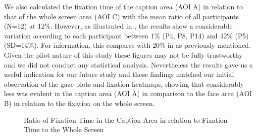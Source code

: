 \documentclass[output=paper]{langsci/langscibook}
\begin{document}
\largerpage[-1] 
We also calculated the fixation time of the caption area (AOI A) in relation to that of the whole screen area (AOI C) with the mean ratio of all participants (N=12) at 12\%.  However, as illustrated in , the results show a considerable variation according to each participant between 1\% (P4, P8, P14) and 42\% (P5) (SD=14\%).  For information, this compares with 20\% in \citet{dydewalle1991} as previously mentioned. Given the pilot nature of this study these figures may not be fully trustworthy and we did not conduct any statistical analysis. Nevertheless the results gave us a useful indication for our future study and these findings matched our initial observation of the gaze plots and fixation heatmaps, showing that considerably less  was evident in the caption area (AOI A) in comparison to the face area (AOI B) in relation to the fixation on the whole screen.  

\begin{figure}



\caption{Ratio of Fixation Time in the Caption Area in relation to Fixation Time to the Whole Screen}
\label{ohagan:fig:5}
\end{figure}
\end{document}
